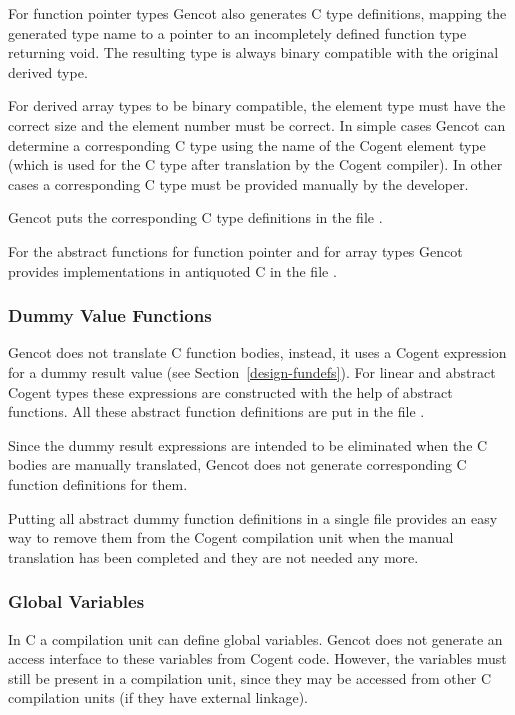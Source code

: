 For function pointer types Gencot also generates C type definitions, mapping the generated type name to
a pointer to an incompletely defined function type returning void. The resulting type is always binary compatible 
with the original derived type.

For derived array types to be binary compatible, the element type must have the correct size and the 
element number must be correct. In simple cases Gencot can determine a corresponding C type using the name of
the Cogent element type (which is used for the C type after translation by the Cogent compiler). In other cases
a corresponding C type must be provided manually by the developer. 

Gencot puts the corresponding C type definitions in the file .

For the abstract functions for function pointer and for array types Gencot provides implementations in
antiquoted C in the file .

\subsubsection{Dummy Value Functions}

Gencot does not translate C function bodies, instead, it uses a Cogent expression for a dummy result value 
(see Section~\ref{design-fundefs}). For linear and abstract Cogent types these expressions are constructed with the
help of abstract functions. All these abstract function definitions are put in the file .

Since the dummy result expressions are intended to be eliminated when the C bodies are manually translated, Gencot 
does not generate corresponding C function definitions for them.

Putting all abstract dummy function definitions in a single file provides an easy way to remove them from the 
Cogent compilation unit when the manual translation has been completed and they are not needed any more.

\subsubsection{Global Variables}

In C a compilation unit can define global variables. Gencot does not generate an access interface to these variables
from Cogent code. However, the variables must still be present in a compilation unit, since they may be accessed
from other C compilation units (if they have external linkage). 

